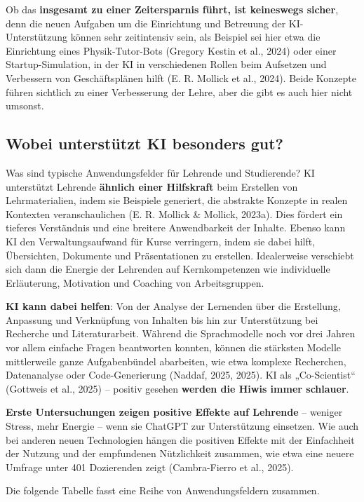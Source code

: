 \documentclass[
  ngerman,
  letterpaper,
  DIV=11]{scrreprt}
\begin{document}
Ob das \textbf{insgesamt zu einer Zeitersparnis führt, ist keineswegs
sicher}, denn die neuen Aufgaben um die Einrichtung und Betreuung der
KI-Unterstützung können sehr zeitintensiv sein, als Beispiel sei hier
etwa die Einrichtung eines Physik-Tutor-Bots (Gregory Kestin et al.,
2024) oder einer Startup-Simulation, in der KI in verschiedenen Rollen
beim Aufsetzen und Verbessern von Geschäftsplänen hilft (E. R. Mollick
et al., 2024). Beide Konzepte führen sichtlich zu einer Verbesserung der
Lehre, aber die gibt es auch hier nicht umsonst.

\subsection{Wobei unterstützt KI besonders
gut?}\label{sec-unterstuetzung}

Was sind typische Anwendungsfelder für Lehrende und Studierende? KI
unterstützt Lehrende \textbf{ähnlich einer Hilfskraft} beim Erstellen
von Lehrmaterialien, indem sie Beispiele generiert, die abstrakte
Konzepte in realen Kontexten veranschaulichen (E. R. Mollick \& Mollick,
2023a). Dies fördert ein tieferes Verständnis und eine breitere
Anwendbarkeit der Inhalte. Ebenso kann KI den Verwaltungsaufwand für
Kurse verringern, indem sie dabei hilft, Übersichten, Dokumente und
Präsentationen zu erstellen. Idealerweise verschiebt sich dann die
Energie der Lehrenden auf Kernkompetenzen wie individuelle Erläuterung,
Motivation und Coaching von Arbeitsgruppen.

\textbf{KI kann dabei helfen}: Von der Analyse der Lernenden über die
Erstellung, Anpassung und Verknüpfung von Inhalten bis hin zur
Unterstützung bei Recherche und Literaturarbeit. Während die
Sprachmodelle noch vor drei Jahren vor allem einfache Fragen beantworten
konnten, können die stärksten Modelle mittlerweile ganze Aufgabenbündel
abarbeiten, wie etwa komplexe Recherchen, Datenanalyse oder
Code-Generierung (Naddaf, 2025, 2025). KI als „Co-Scientist`` (Gottweis
et al., 2025) -- positiv gesehen \textbf{werden die Hiwis immer
schlauer}.

\textbf{Erste Untersuchungen zeigen positive Effekte auf Lehrende} --
weniger Stress, mehr Energie -- wenn sie ChatGPT zur Unterstützung
einsetzen. Wie auch bei anderen neuen Technologien hängen die positiven
Effekte mit der Einfachheit der Nutzung und der empfundenen Nützlichkeit
zusammen, wie etwa eine neuere Umfrage unter 401 Dozierenden zeigt
(Cambra-Fierro et al., 2025).

Die folgende Tabelle fasst eine Reihe von Anwendungsfeldern zusammen.
\end{document}
